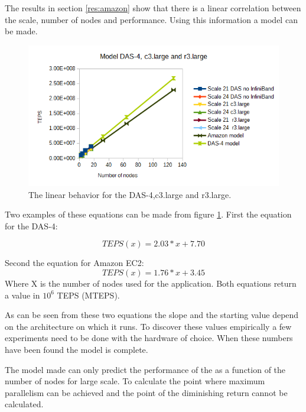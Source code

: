 The results in section \ref{res:amazon} show that there is a linear correlation between the scale, number of nodes and performance. Using this information a model can be made.

\begin{figure}[!h]
	\includegraphics[width=\textwidth]{images/model_figure_1.png}
	\caption{The linear behavior for the DAS-4,c3.large and r3.large.}
	\label{fig:model_first}
\end{figure}

Two examples of these equations can be made from figure \ref{fig:model_first}.
First the equation for the DAS-4:

\begin{equation}
TEPS(x) = 2.03 * x + 7.70
\end{equation}

Second the equation for Amazon EC2:
\begin{equation}
TEPS(x) = 1.76 * x + 3.45
\end{equation}
Where X is the number of nodes used for the application. Both equations return a value in $10^6$ TEPS (MTEPS).

As can be seen from these two equations the slope and the starting value depend on the architecture on which it runs. To discover these values empirically a few experiments need to be done with the hardware of choice. When these numbers have been found the model is complete.

The model made can only predict the performance of the as a function of the number of nodes for large scale. To calculate the point where maximum parallelism can be achieved and the point of the diminishing return cannot be calculated.